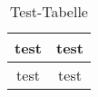 \begin{center}
    \begin{table}[hbt]
        \centering
        \begin{tabular}{c|c}
            test & test \\ \midrule
            test & test \\
        \end{tabular}
        \caption{Test-Tabelle}
        \label{tab:test-table}
    \end{table}
\end{center}